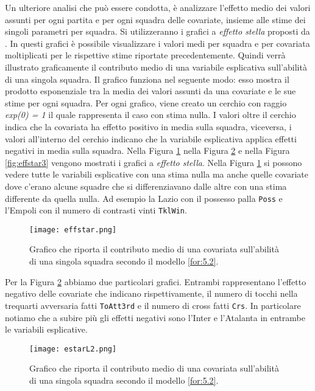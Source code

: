 Un ulteriore analisi che può essere condotta, è analizzare l'effetto medio dei valori assunti per ogni partita e per ogni squadra delle covariate, insieme alle stime dei singoli parametri per squadra. Si utilizzeranno i grafici a \emph{effetto stella} proposti da \textcite{tutz2013visualization}. In questi grafici è possibile visualizzare i valori medi per squadra e per covariata moltiplicati per le rispettive stime riportate precedentemente. Quindi verrà illustrato graficamente il contributo medio di una variabile esplicativa sull'abilità di una singola squadra. Il grafico funziona nel seguente modo: esso mostra il prodotto esponenziale tra la media dei valori assunti da una covariate e le sue stime per ogni squadra. Per ogni grafico, viene creato un cerchio con raggio \emph{exp(0) = 1} il quale rappresenta il caso con stima nulla. I valori oltre il cerchio indica che la covariata ha effetto positivo in media sulla squadra, viceversa, i valori all'interno del cerchio indicano che la variabile esplicativa applica effetti negativi in media sulla squadra. Nella Figura \ref{fig:effstar1} nella Figura \ref{fig:effstar2} e nella Figura \ref{fig:effstar3} vengono mostrati i grafici a \emph{effetto stella}.
Nella Figura \ref{fig:effstar1} si possono vedere tutte le variabili esplicative con una stima nulla ma anche quelle covariate dove c'erano alcune squadre che si differenziavano dalle altre con una stima differente da quella nulla. Ad esempio la Lazio con il possesso palla \texttt{Poss} e l'Empoli con il numero di contrasti vinti \texttt{TklWin}.\\

\begin{figure}[htbp]
	\begin{center}
		\texttt{[image: effstar.png]}
		\caption{Grafico che riporta il contributo medio di una covariata sull'abilità di una singola squadra secondo il modello \ref{for:5.2}.} \label{fig:effstar1}
	\end{center}
\end{figure}

Per la Figura \ref{fig:effstar2} abbiamo due particolari grafici. Entrambi rappresentano l'effetto negativo delle covariate che indicano rispettivamente, il numero di tocchi nella trequarti avversaria fatti \texttt{ToAtt3rd} e il numero di cross fatti \texttt{Crs}. In particolare notiamo che a subire più gli effetti negativi sono l'Inter e l'Atalanta in entrambe le variabili esplicative. 


\begin{figure}[htbp]
	\begin{center}
		\texttt{[image: estarL2.png]}
		\caption{Grafico che riporta il contributo medio di una covariata sull'abilità di una singola squadra secondo il modello \ref{for:5.2}.} \label{fig:effstar2}
	\end{center}
\end{figure}

